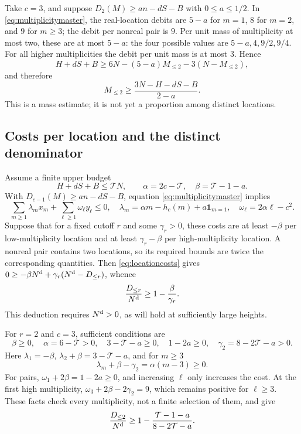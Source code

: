 \documentclass[11pt]{amsart}
\numberwithin{equation}{section}
\newcommand{\Nd}{N^{\rm d}}
\newcommand{\ind}{\mathbf 1}
\begin{document}
Take $c=3$, and suppose $D_2(M)\ge an-dS-B$ with $0\le a\le1/2$.
In \eqref{eq:multiplicitymaster}, the real-location debits are
$5-a$ for $m=1$, $8$ for $m=2$, and $9$ for $m\ge3$; the debit
per nonreal pair is $9$. Per unit mass of multiplicity at most two,
these are at most $5-a$: the four possible values are
$5-a,4,9/2,9/4$. For all higher multiplicities the debit per unit
mass is at most $3$. Hence
\[
 H+dS+B\ge6N-(5-a)M_{\le2}-3(N-M_{\le2}),
\]
and therefore
\begin{equation}
 M_{\le2}\ge\frac{3N-H-dS-B}{2-a}.\label{eq:mass2finite}
\end{equation}
This is a mass estimate; it is not yet a proportion among distinct
locations.

\subsection{Costs per location and the distinct denominator}

Assume a finite upper budget
\begin{equation}
 H+dS+B\le\mathcal T N,\qquad
 \alpha=2c-\mathcal T,\quad \beta=\mathcal T-1-a.\label{eq:upperbudget}
\end{equation}
With $D_{c-1}(M)\ge an-dS-B$, equation
\eqref{eq:multiplicitymaster} implies
\begin{equation}
 \sum_{m\ge1}\lambda_m x_m+\sum_{\ell\ge1}\omega_\ell y_\ell\le0,
 \quad
 \lambda_m=\alpha m-h_c(m)+a\ind_{m=1},\quad
 \omega_\ell=2\alpha\ell-c^2.\label{eq:locationcosts}
\end{equation}
Suppose that for a fixed cutoff $r$ and some $\gamma_r>0$, these
costs are at least $-\beta$ per low-multiplicity location and at
least $\gamma_r-\beta$ per high-multiplicity location. A nonreal
pair contains two locations, so its required bounds are twice the
corresponding quantities. Then \eqref{eq:locationcosts} gives
$0\ge-\beta\Nd+\gamma_r(\Nd-D_{\le r})$, whence
\begin{equation}
 \frac{D_{\le r}}{\Nd}\ge1-\frac\beta{\gamma_r}.
 \label{eq:locationratio}
\end{equation}
This deduction requires $\Nd>0$, as will hold at sufficiently large
heights.

For $r=2$ and $c=3$, sufficient conditions are
\begin{equation}
 \beta\ge0,\quad \alpha=6-\mathcal T>0,\quad
 3-\mathcal T-a\ge0,\quad1-2a\ge0,\quad
 \gamma_2=8-2\mathcal T-a>0.\label{eq:guards2}
\end{equation}
Here $\lambda_1=-\beta$,
$\lambda_2+\beta=3-\mathcal T-a$, and for $m\ge3$
\[
 \lambda_m+\beta-\gamma_2=\alpha(m-3)\ge0.
\]
For pairs, $\omega_1+2\beta=1-2a\ge0$, and increasing
$\ell$ only increases the cost. At the first high multiplicity,
$\omega_3+2\beta-2\gamma_2=9$, which remains positive for
$\ell\ge3$. These facts check every multiplicity, not a finite
selection of them, and give
\begin{equation}
 \frac{D_{\le2}}{\Nd}\ge
 1-\frac{\mathcal T-1-a}{8-2\mathcal T-a}.\label{eq:distinct2finite}
\end{equation}
\end{document}
